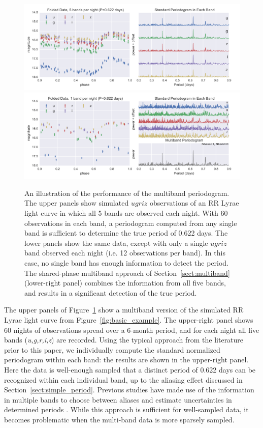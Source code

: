 \documentclass[12pt,preprint]{aastex}
\newcommand{\Fig}[1]{Figure~\ref{fig:#1}}
\newcommand{\fig}[1]{\Fig{#1}}
\newcommand{\figlabel}[1]{\label{fig:#1}}
\newcommand{\Sect}[1]{Section~\ref{sect:#1}}
\newcommand{\sect}[1]{\Sect{#1}}
\begin{document}
\begin{figure}
  \centering
  \includegraphics[width=\textwidth]{fig05a.pdf}
  \includegraphics[width=\textwidth]{fig05b.pdf}
  \caption{
    An illustration of the performance of the multiband periodogram. The
    upper panels show simulated $ugriz$ observations of an RR Lyrae light
    curve in which all 5 bands are observed each night. With 60 observations
    in each band, a periodogram computed from any single band is sufficient to
    determine the true period of 0.622 days. The lower panels show the same
    data, except with only a single $ugriz$ band observed each night (i.e.
    12 observations per band). In this case, no single band has enough
    information to detect the period. The shared-phase multiband approach
    of \sect{multiband} (lower-right panel) combines the information from
    all five bands, and results in a significant detection of the true period.
  }
  \figlabel{multiband_sim}
\end{figure}

The upper panels of \fig{multiband_sim} show a multiband version of the simulated RR Lyrae light curve from \fig{basic_example}.
The upper-right panel shows 60 nights of observations spread over a 6-month period, and for each night all five bands ({\it u,g,r,i,z}) are recorded.
Using the typical approach from the literature prior to this paper, we individually compute the standard normalized periodogram within each band: the results are shown in the upper-right panel.
Here the data is well-enough sampled that a distinct period of 0.622 days can be recognized within each individual band, up to the aliasing effect discussed in \sect{simple_period}.
Previous studies have made use of the information in multiple bands to choose between aliases and estimate uncertainties in determined periods \citep[e.g.][]{Oluseyi12,Sesar2010}.
While this approach is sufficient for well-sampled data, it becomes problematic when the multi-band data is more sparsely sampled.
\end{document}
